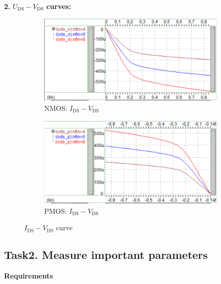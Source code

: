 \documentclass[UTF8,12pt,a4paper]{article}
\begin{document}
\textbf{2.} $U_{\text{DS}}-V_{\text{DS}}$ \textbf{curves:}
\begin{figure}[htbp]
    \centering
    \begin{subfigure}[b]{0.45\textwidth} %
        \centering
        \includegraphics[width=\textwidth]{figure/wv_Task1_Fin_NFET.png} 
        \caption{NMOS: $I_{\text{DS}}-V_{\text{DS}}$}
        \label{fig:NFET_I_V}
    \end{subfigure}
    \hfill %
    \begin{subfigure}[b]{0.45\textwidth}
        \centering
        \includegraphics[width=\textwidth]{figure/wv_Task1_Fin_PFET.png} 
        \caption{PMOS: $I_{\text{DS}}-V_{\text{DS}}$}
        \label{fig:PFET_I_V}
    \end{subfigure}
    \caption{$I_{\text{DS}}-V_{\text{DS}}$ curve}
    \label{fig:FET_IV}
\end{figure}

\subsection{Task2. Measure important parameters}

\textbf{Requirements}
\end{document}
